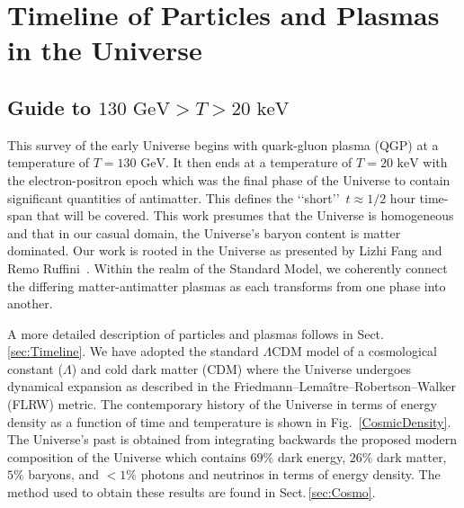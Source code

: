 \documentclass[universe,article,submit,moreauthors,pdftex,a4paper]{Definitions/mdpi}
\newcommand{\GeV}{\text{ GeV}}
\newcommand{\keV}{\text{ keV}}
\newcommand*{\rf}[1]{Fig.~{\ref{#1}}}
\newcommand*{\rsec}[1]{Sect.\,{\ref{#1}}}
\begin{document}

\tableofcontents

\section{Timeline of Particles and Plasmas in the Universe}\label{sec:Intro}
\subsection{Guide to \texorpdfstring{$130\GeV>T>20\keV$}{130\GeV>T>20\keV}}\label{sec:Guide}
\noindent This survey of the early Universe begins with quark-gluon plasma (QGP) at a temperature of $T=130\GeV$. It then ends at a temperature of $T=20\keV$ with the electron-positron epoch which was the final phase of the Universe to contain significant quantities of antimatter. This defines the \lq\lq short\rq\rq\ $t\approx1/2$ hour time-span that will be covered. This work presumes that the Universe is homogeneous and that in our casual domain, the Universe's baryon content is matter dominated. Our work is rooted in the Universe as presented by Lizhi Fang and Remo Ruffini~\cite{fang1984cosmology,fang1985galaxies,fang1987quantum}. Within the realm of the Standard Model, we coherently connect the differing matter-antimatter plasmas as each transforms from one phase into another.

A more detailed description of particles and plasmas follows in \rsec{sec:Timeline}. We have adopted the standard $\Lambda$CDM model of a cosmological constant ($\Lambda$) and cold dark matter (CDM) where the Universe undergoes dynamical expansion as described in the Friedmann–Lemaître–Robertson–Walker (FLRW) metric. The contemporary history of the Universe in terms of energy density as a function of time and temperature is shown in \rf{CosmicDensity}. The Universe's past is obtained from integrating backwards the proposed modern composition of the Universe which contains $69\%$ dark energy, $26\%$ dark matter, $5\%$ baryons, and $<1\%$ photons and neutrinos in terms of energy density. The method used to obtain these results are found in \rsec{sec:Cosmo}.
\end{document}
